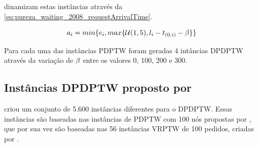 \documentclass{anpet}
\begin{document}
\textcite{pureza_waiting_2008} dinamizam estas instâncias através da \autoref{eq:pureza_waiting_2008_requestArrivalTime}.

\begin{equation}
    a_{i} = min\{e_i{}, max\{\mathcal{U}(1,5), l_i{} - t_{(0,i{})} - \beta\}\}    
    \label{eq:pureza_waiting_2008_requestArrivalTime}
\end{equation}


Para cada uma das instâncias PDPTW foram geradas 4 intâncias DPDPTW através da variação de $\beta$ entre os valores 0, 100, 200 e 300.

\subsection{Instâncias DPDPTW proposto por \textcite{pankratz_dynamic_2005}}

\textcite{pankratz_dynamic_2005} criou um conjunto de 5.600 instâncias diferentes para o DPDPTW. Essas instâncias são baseadas nas instâncias de PDPTW com 100 nós propostas por \textcite{li_metaheuristic_2003}, que por sua vez são baseadas nas 56 instâncias VRPTW de 100 pedidos, criadas por \textcite{solomon_algorithms_1987}.
\end{document}
